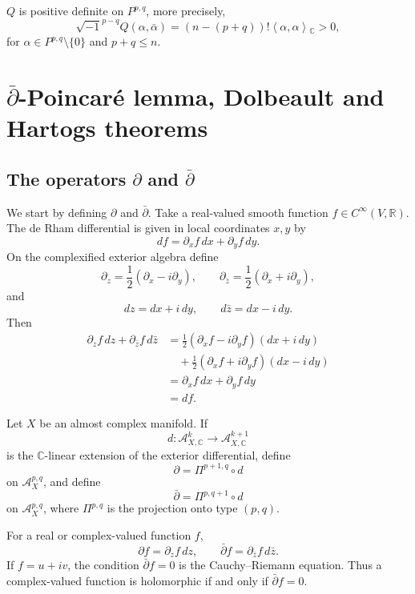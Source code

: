 \begin{theorem}
\label{theorem-hodge-riemann-relation}
$Q$ is positive definite on $P^{p,q}$, more
precisely,
$$
\sqrt{-1}^{p-q}Q(\alpha,\bar{\alpha})
=(n-(p+q))!\left\langle{}\alpha,
\alpha\right\rangle{}_{\mathbb{C}}>0,
$$
for $\alpha \in P^{p,q}\setminus\{0\}$ and
$p+q\leq n$.
\end{theorem}

\medskip\noindent

\section{$\bar\partial$-Poincaré lemma,
Dolbeault and Hartogs theorems}
\label{section-dbar-poincare}
\subsection{The operators $\partial$ and
$\bar\partial$}
\label{subsection-del-and-dbar}

\noindent
We start by defining $\partial$ and
$\bar\partial$.
Take a real-valued smooth function
$f\in C^\infty(V,\mathbb{R})$.
The de Rham differential is given in local
coordinates $x,y$ by
$$
df=\partial_xf\,dx+\partial_yf\,dy.
$$
On the complexified exterior algebra define
$$
\partial_z
=
\frac{1}{2}(\partial_x-i\partial_y),
\qquad
\partial_{\bar z}
=
\frac{1}{2}(\partial_x+i\partial_y),
$$
and
$$
dz=dx+i\,dy,
\qquad
d\bar z=dx-i\,dy.
$$
Then
$$
\begin{aligned}
\partial_zf\,dz
+\partial_{\bar z}f\,d\bar z
&=
\frac{1}{2}
(\partial_xf-i\partial_yf)(dx+i\,dy)\\
&\quad+
\frac{1}{2}
(\partial_xf+i\partial_yf)(dx-i\,dy)\\
&=
\partial_xf\,dx+\partial_yf\,dy\\
&=df.
\end{aligned}
$$

\begin{definition}
\label{definition-dbar}
Let $X$ be an almost complex manifold.
If
$$
d:
\mathcal A^k_{X,\mathbb C}
\longrightarrow
\mathcal A^{k+1}_{X,\mathbb C}
$$
is the $\mathbb C$-linear extension of the
exterior differential, define
$$
\partial
=
\Pi^{p+1,q}\circ d
$$
on $\mathcal A^{p,q}_X$, and define
$$
\bar\partial
=
\Pi^{p,q+1}\circ d
$$
on $\mathcal A^{p,q}_X$, where
$\Pi^{p,q}$ is the projection onto type
$(p,q)$.
\end{definition}

For a real or complex-valued function $f$,
$$
\partial f=\partial_zf\,dz,
\qquad
\bar\partial f
=
\partial_{\bar z}f\,d\bar z.
$$
If $f=u+iv$, the condition
$\bar\partial f=0$ is the Cauchy--Riemann
equation. Thus a complex-valued function is
holomorphic if and only if
$\bar\partial f=0$.


